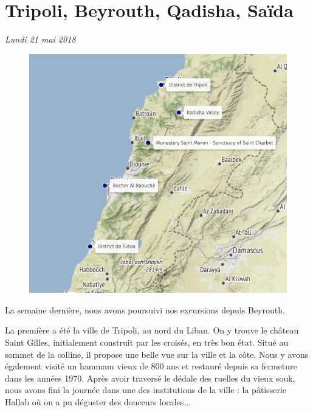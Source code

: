 \hypertarget{tripoli-beyrouth-qadisha-sauxefda}{%
\section{Tripoli, Beyrouth, Qadisha,
Saïda}\label{tripoli-beyrouth-qadisha-sauxefda}}

\emph{Lundi 21 mai 2018}

\begin{figure}
\centering
\includegraphics{maps/Liban3_1.png}
\end{figure}

La semaine dernière, nous avons poursuivi nos excursions depuis
Beyrouth.

La première a été la ville de Tripoli, au nord du Liban. On y trouve le
château Saint Gilles, initialement construit par les croisés, en très
bon état. Situé au sommet de la colline, il propose une belle vue sur la
ville et la côte. Nous y avons également visité un hammam vieux de 800
ans et restauré depuis sa fermeture dans les années 1970. Après avoir
traversé le dédale des ruelles du vieux souk, nous avons fini la journée
dans une des institutions de la ville : la pâtisserie Hallab où on a pu
déguster des douceurs locales...

